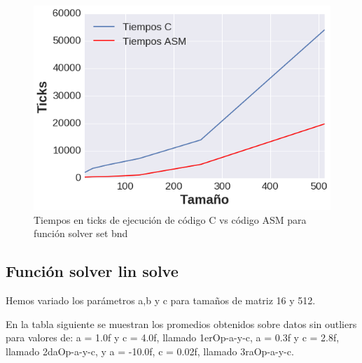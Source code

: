 \begin{figure}[h]

\centering
\includegraphics[scale=0.6] {grafica_set_bound}
  
 \caption{Tiempos en ticks de ejecución de código C vs código ASM para función solver set bnd}
\end{figure} 

\subsection{Función solver lin solve}
Hemos variado los parámetros a,b y c para tamaños de matriz 16 y 512.

En la tabla siguiente se muestran los promedios obtenidos sobre datos sin outliers para valores de: a = 1.0f y c = 4.0f, llamado 1erOp-a-y-c, a = 0.3f y c = 2.8f, llamado 2daOp-a-y-c, y a = -10.0f, c = 0.02f, llamado 3raOp-a-y-c.

